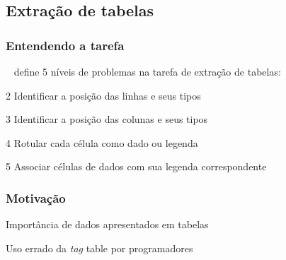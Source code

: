 \documentclass{beamer}
\newenvironment{my_itemize}{
\begin{itemize}
  \setlength{\itemsep}{5pt}
  \setlength{\parskip}{2pt}
  \setlength{\parsep}{3pt}
}{\end{itemize}}
\begin{document}
\subsection{Extração de tabelas}

\begin{frame}
\frametitle{Entendendo a tarefa}%
~\cite{Pinto2003} define 5 níveis de problemas na tarefa de extração de
tabelas:

  \begin{my_itemize}

    \item[2] Identificar a posição das linhas e seus tipos
    \item[3] Identificar a posição das colunas e seus tipos
    \item[4] Rotular cada célula como dado ou legenda
    \item[5] Associar células de dados com sua legenda correspondente
  \end{my_itemize}
\end{frame}

\begin{frame}
\frametitle{Motivação}
  \begin{my_itemize}
    \item Importância de dados apresentados em tabelas
    \item Uso errado da \textit{tag} table por programadores
  \end{my_itemize}
\end{frame}
\end{document}
